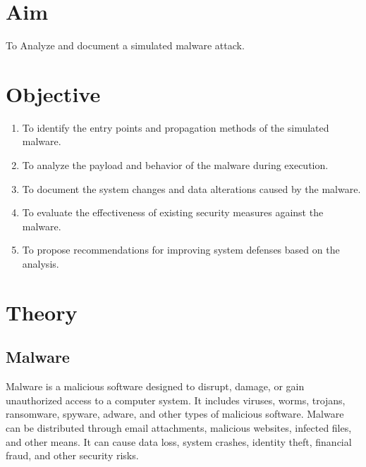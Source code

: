 \documentclass[11pt]{article}
\begin{document}
\tableofcontents
\thispagestyle{empty}
\clearpage

\setcounter{page}{1}
\section{Aim}
To Analyze and document a simulated malware attack.
\section{Objective}
\begin{enumerate}
    \item To identify the entry points and propagation methods of the simulated malware.
    \item To analyze the payload and behavior of the malware during execution.
    \item To document the system changes and data alterations caused by the malware.
    \item To evaluate the effectiveness of existing security measures against the malware.
    \item To propose recommendations for improving system defenses based on the analysis.
\end{enumerate}
\section{Theory}
\subsection{Malware}
Malware is a malicious software designed to disrupt, damage, or gain unauthorized access to a computer system. It includes viruses, worms, trojans, ransomware, spyware, adware, and other types of malicious software. Malware can be distributed through email attachments, malicious websites, infected files, and other means. It can cause data loss, system crashes, identity theft, financial fraud, and other security risks.
\end{document}
